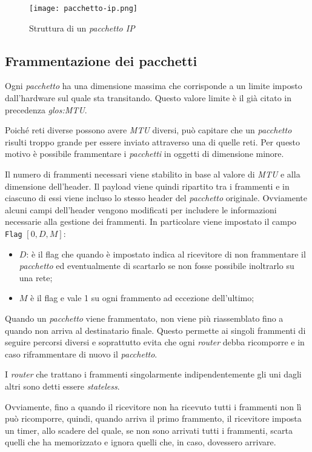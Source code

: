 \begin{figure}[h!]
    \centering
    \texttt{[image: pacchetto-ip.png]}
    \caption{Struttura di un \emph{pacchetto IP}}
\end{figure}

\subsection{Frammentazione dei pacchetti}
Ogni \emph{pacchetto} ha una dimensione massima che corrisponde a un limite
imposto dall'hardware sul quale sta transitando. Questo valore limite è il già
citato in precedenza \emph{\gls{glos:MTU}}.

Poiché reti diverse possono avere \emph{MTU} diversi, può capitare che un
\emph{pacchetto} risulti troppo grande per essere inviato attraverso una di quelle
reti. Per questo motivo è possibile frammentare i \emph{pacchetti} in oggetti di
dimensione minore.

Il numero di frammenti necessari viene stabilito in base al valore di \emph{MTU}
e alla dimensione dell'header. Il payload viene quindi ripartito tra i frammenti
e in ciascuno di essi viene incluso lo stesso header del \emph{pacchetto}
originale. Ovviamente alcuni campi dell'header vengono modificati per includere
le informazioni necessarie alla gestione dei frammenti. In particolare viene
impostato il campo \texttt{Flag} $[0, D, M]$:
\begin{itemize}
    \item $D$: è il flag  che quando è impostato indica
    al ricevitore di non frammentare il \emph{pacchetto} ed eventualmente di
    scartarlo se non fosse possibile inoltrarlo su una rete;
    \item $M$ è il flag  e vale 1 su ogni frammento ad
    eccezione dell'ultimo;
\end{itemize}
Quando un \emph{pacchetto} viene frammentato, non viene più riassemblato fino
a quando non arriva al destinatario finale. Questo permette ai singoli frammenti
di seguire percorsi diversi e soprattutto evita che ogni \emph{router} debba
ricomporre e in caso riframmentare di nuovo il \emph{pacchetto}.

\begin{note}
    I \emph{router} che trattano i frammenti singolarmente indipendentemente gli
    uni dagli altri sono detti essere \emph{stateless}.
\end{note}\noindent
Ovviamente, fino a quando il ricevitore non ha ricevuto tutti i frammenti non
lì può ricomporre, quindi, quando arriva il primo frammento, il ricevitore
imposta un timer, allo scadere del quale, se non sono arrivati tutti i frammenti,
scarta quelli che ha memorizzato e ignora quelli che, in caso, dovessero arrivare.

